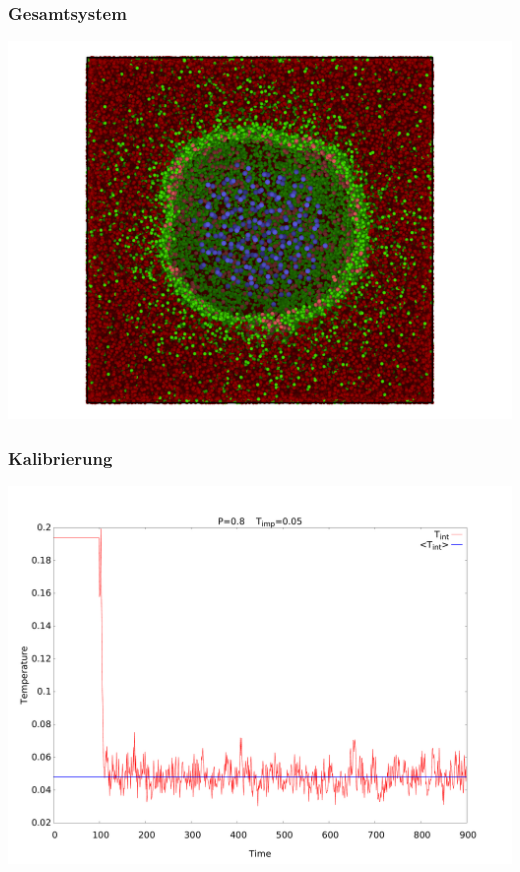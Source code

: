 \documentclass{beamer}
\begin{document}
\begin{frame}
\frametitle{Gesamtsystem}
\begin{center}
\includegraphics[scale=0.2]{../images/baro_170126_large.png}
\end{center}
\end{frame}

\begin{frame}
\frametitle{Kalibrierung}
\begin{center}
\includegraphics[scale=0.2]{../images/t_int.pdf}
\end{center}
\end{frame}
\end{document}
